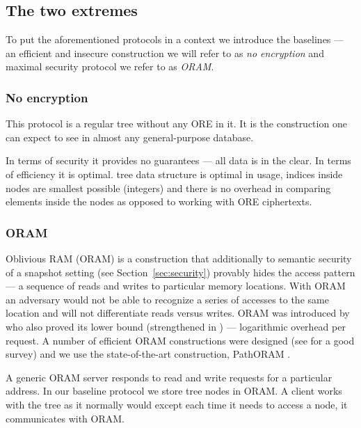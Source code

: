\subsection{The two extremes}

	To put the aforementioned protocols in a context we introduce the baselines --- an efficient and insecure construction we will refer to as \emph{no encryption} and maximal security protocol we refer to as \emph{ORAM}.

	\subsubsection{No encryption}

		This protocol is a regular {\BPlus} tree \cite{b-tree} without any ORE in it.
		It is the construction one can expect to see in almost any general-purpose database.

		In terms of security it provides no guarantees --- all data is in the clear.
		In terms of efficiency it is optimal.
		{\BPlus} tree data structure is optimal in {\IO} usage, indices inside nodes are smallest possible (integers) and there is no overhead in comparing elements inside the nodes as opposed to working with ORE ciphertexts.

	\subsubsection{ORAM}\label{sec:oram}

		Oblivious RAM (ORAM) is a construction that additionally to semantic security of a snapshot setting (see Section~\ref{sec:security}) provably hides the access pattern --- a sequence of reads and writes to particular memory locations.
		With ORAM an adversary would not be able to recognize a series of accesses to the same location and will not differentiate reads versus writes.
		ORAM was introduced by~\textcite{oram-original} who also proved its lower bound (strengthened in \cite{oram-tighter-lower-bound}) --- logarithmic overhead per request.
		A number of efficient ORAM constructions were designed (see \cite{oram-survey-feifei} for a good survey) and we use the state-of-the-art construction, PathORAM \cite{path-oram}.

		A generic ORAM server responds to read and write requests for a particular address.
		In our baseline protocol we store {\BPlus} tree nodes in ORAM\@.
		A client works with the tree as it normally would except each time it needs to access a node, it communicates with ORAM\@.

